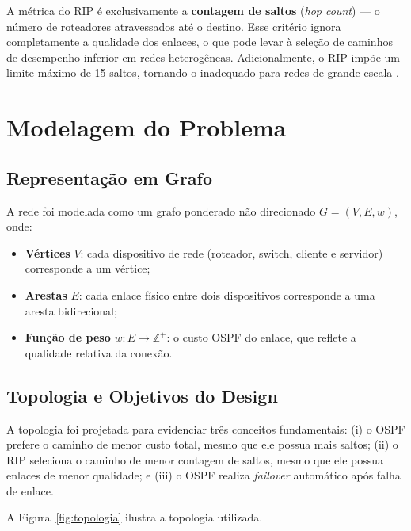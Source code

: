 \documentclass[12pt]{article}
\begin{document}
A métrica do RIP é exclusivamente a \textbf{contagem de saltos} (\textit{hop
count}) — o número de roteadores atravessados até o destino. Esse critério ignora
completamente a qualidade dos enlaces, o que pode levar à seleção de caminhos de
desempenho inferior em redes heterogêneas. Adicionalmente, o RIP impõe um limite
máximo de 15 saltos, tornando-o inadequado para redes de grande escala \cite{rfc2453}.

\section{Modelagem do Problema}
\label{sec:modelagem}

\subsection{Representação em Grafo}

A rede foi modelada como um grafo ponderado não direcionado $G = (V, E, w)$, onde:

\begin{itemize}
  \item \textbf{Vértices} $V$: cada dispositivo de rede (roteador, switch, cliente
        e servidor) corresponde a um vértice;
  \item \textbf{Arestas} $E$: cada enlace físico entre dois dispositivos
        corresponde a uma aresta bidirecional;
  \item \textbf{Função de peso} $w: E \to \mathbb{Z}^+$: o custo OSPF do enlace,
        que reflete a qualidade relativa da conexão.
\end{itemize}

\subsection{Topologia e Objetivos do Design}

A topologia foi projetada para evidenciar três conceitos fundamentais: (i) o OSPF
prefere o caminho de menor custo total, mesmo que ele possua mais saltos; (ii) o
RIP seleciona o caminho de menor contagem de saltos, mesmo que ele possua enlaces
de menor qualidade; e (iii) o OSPF realiza \textit{failover} automático após falha
de enlace.

A Figura~\ref{fig:topologia} ilustra a topologia utilizada.
\end{document}
